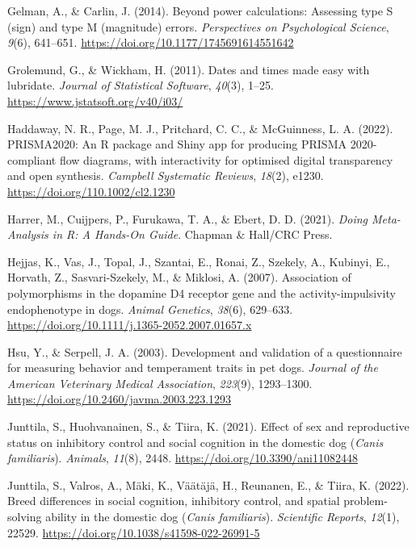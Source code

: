 \documentclass[
  ,pub,floatsintext]{apa6}
\newlength{\cslhangindent}
\newlength{\cslentryspacingunit} %
\newenvironment{CSLReferences}[2] %
 {%
  \setlength{\parindent}{0pt}
  \ifodd #1
  \let\oldpar\par
  \def\par{\hangindent=\cslhangindent\oldpar}
  \fi
  \setlength{\parskip}{#2\cslentryspacingunit}
 }%
 {}
\begin{document}
\begin{CSLReferences}{1}{0}
\leavevmode{}%
Gelman, A., \& Carlin, J. (2014). Beyond power calculations: {Assessing} type {S} (sign) and type {M} (magnitude) errors. \emph{Perspectives on Psychological Science}, \emph{9}(6), 641--651. \url{https://doi.org/10.1177/1745691614551642}

\leavevmode{}%
Grolemund, G., \& Wickham, H. (2011). Dates and times made easy with {lubridate}. \emph{Journal of Statistical Software}, \emph{40}(3), 1--25. \url{https://www.jstatsoft.org/v40/i03/}

\leavevmode{}%
Haddaway, N. R., Page, M. J., Pritchard, C. C., \& McGuinness, L. A. (2022). PRISMA2020: An {R} package and {Shiny} app for producing PRISMA 2020-compliant flow diagrams, with interactivity for optimised digital transparency and open synthesis. \emph{Campbell Systematic Reviews}, \emph{18}(2), e1230. \url{https://doi.org/110.1002/cl2.1230}

\leavevmode{}%
Harrer, M., Cuijpers, P., Furukawa, T. A., \& Ebert, D. D. (2021). \emph{Doing {Meta-Analysis} in {R}: {A Hands-On Guide}}. {Chapman \& Hall/CRC Press}.

\leavevmode{}%
Hejjas, K., Vas, J., Topal, J., Szantai, E., Ronai, Z., Szekely, A., Kubinyi, E., Horvath, Z., Sasvari-Szekely, M., \& Miklosi, A. (2007). Association of polymorphisms in the dopamine {D4} receptor gene and the activity-impulsivity endophenotype in dogs. \emph{Animal Genetics}, \emph{38}(6), 629--633. \url{https://doi.org/10.1111/j.1365-2052.2007.01657.x}

\leavevmode{}%
Hsu, Y., \& Serpell, J. A. (2003). Development and validation of a questionnaire for measuring behavior and temperament traits in pet dogs. \emph{Journal of the American Veterinary Medical Association}, \emph{223}(9), 1293--1300. \url{https://doi.org/10.2460/javma.2003.223.1293}

\leavevmode{}%
Junttila, S., Huohvanainen, S., \& Tiira, K. (2021). Effect of sex and reproductive status on inhibitory control and social cognition in the domestic dog (\emph{{Canis} familiaris}). \emph{Animals}, \emph{11}(8), 2448. \url{https://doi.org/10.3390/ani11082448}

\leavevmode{}%
Junttila, S., Valros, A., Mäki, K., Väätäjä, H., Reunanen, E., \& Tiira, K. (2022). Breed differences in social cognition, inhibitory control, and spatial problem-solving ability in the domestic dog (\emph{{Canis} familiaris}). \emph{Scientific Reports}, \emph{12}(1), 22529. \url{https://doi.org/10.1038/s41598-022-26991-5}


\end{CSLReferences}
\end{document}
